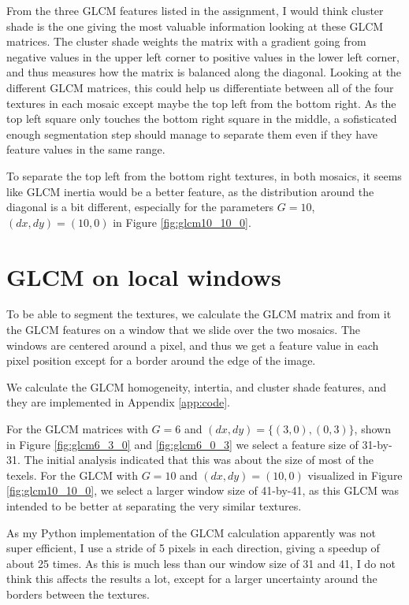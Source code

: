 \documentclass[a4paper]{article}
\begin{document}
From the three GLCM features listed in the assignment, I would think
cluster shade is the one giving the most valuable information looking at
these GLCM matrices. The cluster shade weights the matrix with a
gradient going from negative values in the upper left corner to positive
values in the lower left corner, and thus measures how the matrix is
balanced along the diagonal. Looking at the different GLCM matrices,
this could help us differentiate between all of the four textures in
each mosaic except maybe the top left from the bottom right. As the top
left square only touches the bottom right square in the middle, a
sofisticated enough segmentation step should manage to separate them
even if they have feature values in the same range.

To separate the top left from the bottom right textures, in both
mosaics, it seems like GLCM inertia would be a better feature, as the
distribution around the diagonal is a bit different, especially for the
parameters $G = 10$, $(dx, dy) = (10, 0)$ in Figure
\ref{fig:glcm10_10_0}.

\section{GLCM on local windows}

To be able to segment the textures, we calculate the GLCM matrix and
from it the GLCM features on a window that we slide over the two
mosaics. The windows are centered around a pixel, and thus we get a
feature value in each pixel position except for a border around the edge
of the image. 

We calculate the GLCM homogeneity, intertia, and cluster shade features,
and they are implemented in Appendix \ref{app:code}.

For the GLCM matrices with $G = 6$ and $(dx, dy) = \{(3, 0), (0, 3)\}$,
shown in Figure \ref{fig:glcm6_3_0} and \ref{fig:glcm6_0_3} we select a
feature size of 31-by-31. The initial analysis indicated that this was
about the size of most of the texels. For the GLCM with $G = 10$ and
$(dx, dy) = (10, 0)$ visualized in Figure \ref{fig:glcm10_10_0}, we
select a larger window size of 41-by-41, as this GLCM was intended to be
better at separating the very similar textures.

As my Python implementation of the GLCM calculation apparently was not
super efficient, I use a stride of 5 pixels in each direction, giving a
speedup of about 25 times. As this is much less than our window size of
31 and 41, I do not think this affects the results a lot, except for a
larger uncertainty around the borders between the textures.
\end{document}
